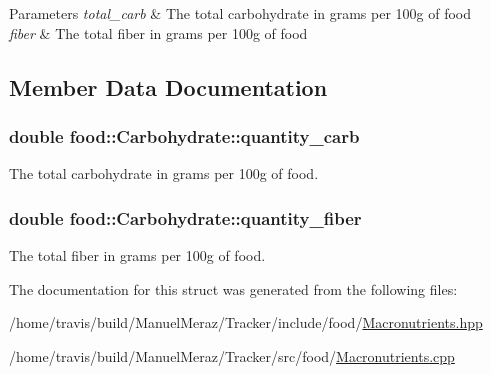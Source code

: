 \begin{DoxyParams}{Parameters}
{\em total\+\_\+carb} & The total carbohydrate in grams per 100g of food \\
\hline
{\em fiber} & The total fiber in grams per 100g of food \\
\hline
\end{DoxyParams}


\subsection{Member Data Documentation}
\subsubsection[{\texorpdfstring{quantity\+\_\+carb}{quantity_carb}}]{\setlength{\rightskip}{0pt plus 5cm}double food\+::\+Carbohydrate\+::quantity\+\_\+carb}\hypertarget{structfood_1_1_carbohydrate_a7f187c69c3f4a4013b2208c207b056dc}{}\label{structfood_1_1_carbohydrate_a7f187c69c3f4a4013b2208c207b056dc}


The total carbohydrate in grams per 100g of food. 

\subsubsection[{\texorpdfstring{quantity\+\_\+fiber}{quantity_fiber}}]{\setlength{\rightskip}{0pt plus 5cm}double food\+::\+Carbohydrate\+::quantity\+\_\+fiber}\hypertarget{structfood_1_1_carbohydrate_a6d66e644feb14e99eeba8e3b3c4b70ac}{}\label{structfood_1_1_carbohydrate_a6d66e644feb14e99eeba8e3b3c4b70ac}


The total fiber in grams per 100g of food. 



The documentation for this struct was generated from the following files\+:\begin{DoxyCompactItemize}
\item 
/home/travis/build/\+Manuel\+Meraz/\+Tracker/include/food/\hyperlink{_macronutrients_8hpp}{Macronutrients.\+hpp}\item 
/home/travis/build/\+Manuel\+Meraz/\+Tracker/src/food/\hyperlink{_macronutrients_8cpp}{Macronutrients.\+cpp}\end{DoxyCompactItemize}
